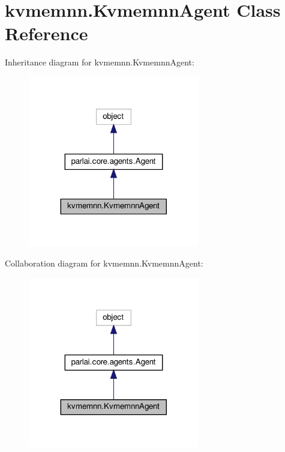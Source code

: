 \hypertarget{classkvmemnn_1_1KvmemnnAgent}{}\section{kvmemnn.\+Kvmemnn\+Agent Class Reference}
\label{classkvmemnn_1_1KvmemnnAgent}


Inheritance diagram for kvmemnn.\+Kvmemnn\+Agent\+:
\nopagebreak
\begin{figure}[H]
\begin{center}
\leavevmode
\includegraphics[width=212pt]{classkvmemnn_1_1KvmemnnAgent__inherit__graph}
\end{center}
\end{figure}


Collaboration diagram for kvmemnn.\+Kvmemnn\+Agent\+:
\nopagebreak
\begin{figure}[H]
\begin{center}
\leavevmode
\includegraphics[width=212pt]{classkvmemnn_1_1KvmemnnAgent__coll__graph}
\end{center}
\end{figure}
